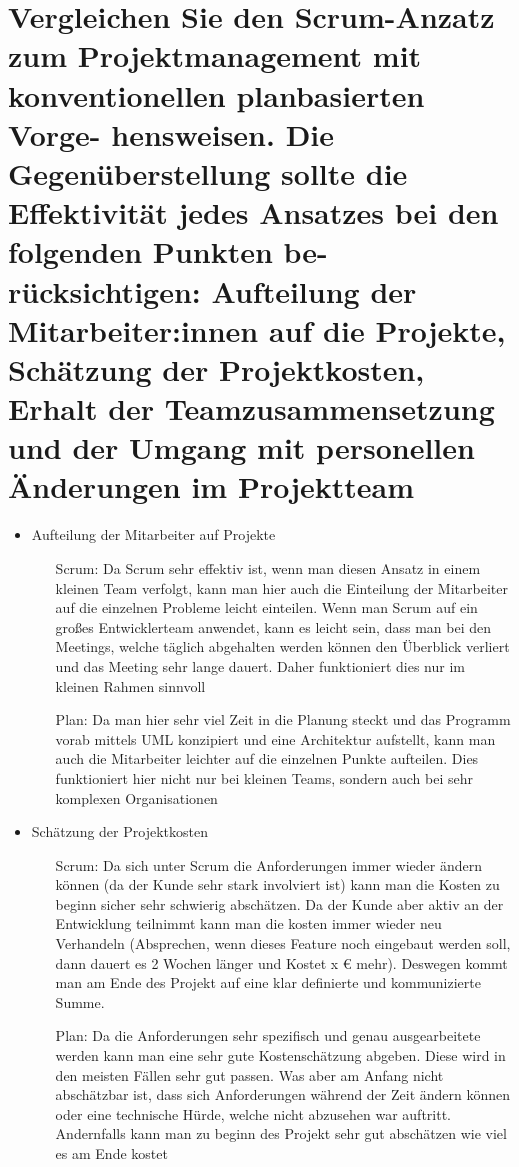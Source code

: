 \documentclass[12pt]{article}
\begin{document}
\section{Vergleichen Sie den Scrum-Anzatz zum Projektmanagement mit konventionellen planbasierten Vorge-
hensweisen. Die Gegenüberstellung sollte die Effektivität jedes Ansatzes bei den folgenden Punkten be-
rücksichtigen: Aufteilung der Mitarbeiter:innen auf die Projekte, Schätzung der Projektkosten, Erhalt der
Teamzusammensetzung und der Umgang mit personellen Änderungen im Projektteam}
\begin{itemize}
 \item Aufteilung der Mitarbeiter auf Projekte
 \begin{itemize}
  \item [Scrum:] Da Scrum sehr effektiv ist, wenn man diesen Ansatz in einem kleinen Team verfolgt, kann man hier auch die Einteilung der Mitarbeiter auf die einzelnen Probleme leicht einteilen. Wenn man Scrum auf ein großes Entwicklerteam anwendet, kann es leicht sein, dass man bei den Meetings, welche täglich abgehalten werden können den Überblick verliert und das Meeting sehr lange dauert. Daher funktioniert dies nur im kleinen Rahmen sinnvoll
  \item[Plan:] Da man hier sehr viel Zeit in die Planung steckt und das Programm vorab mittels UML konzipiert und eine Architektur aufstellt, kann man auch die Mitarbeiter leichter auf die einzelnen Punkte aufteilen. Dies funktioniert hier nicht nur bei kleinen Teams, sondern auch bei sehr komplexen Organisationen
 \end{itemize}
 \item Schätzung der Projektkosten
 \begin{itemize}
  \item [Scrum:] Da sich unter Scrum die Anforderungen immer wieder ändern können (da der Kunde sehr stark involviert ist) kann man die Kosten zu beginn sicher sehr schwierig abschätzen. Da der Kunde aber aktiv an der Entwicklung teilnimmt kann man die kosten immer wieder neu Verhandeln (Absprechen, wenn dieses Feature noch eingebaut werden soll, dann dauert es 2 Wochen länger und Kostet x € mehr). Deswegen kommt man am Ende des Projekt auf eine klar definierte und kommunizierte Summe.
  \item [Plan:] Da die Anforderungen sehr spezifisch und genau ausgearbeitete werden kann man eine sehr gute Kostenschätzung abgeben. Diese wird in den meisten Fällen sehr gut passen. Was aber am Anfang nicht abschätzbar ist, dass sich Anforderungen während der Zeit ändern können oder eine technische Hürde, welche nicht abzusehen war auftritt. Andernfalls kann man zu beginn des Projekt sehr gut abschätzen wie viel es am Ende kostet

\end{itemize}
\end{itemize}
\end{document}
